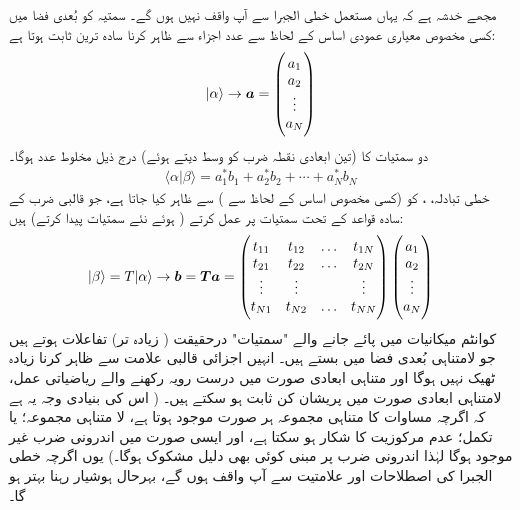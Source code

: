  مجھے خدشہ ہے کہ یہاں مستعمل خطی الجبرا سے آپ واقف نہیں ہوں گے۔ سمتیہ کو  بُعدی فضا میں کسی مخصوص معیاری عمودی اساس کے لحاظ سے  عدد اجزاء 
 سے ظاہر کرنا سادہ ترین ثابت ہوتا ہے:
	\begin{align}
		|\alpha \rangle \rightarrow {\ensuremath{{\boldsymbol{a}}}} = \begin{pmatrix} 
			a_{1}\\
			a_{2}\\
			\vdots\\
			a_{N}
		 \end{pmatrix}
	\end{align}
 دو سمتیات کا 
  (تین ابعادی نقطہ ضرب کو وسط دیتے ہوئے) درج ذیل مخلوط عدد ہوگا۔
\begin{align}\label{مساوات_قواعد_اندرونی_ضرب}
	\langle \alpha | \beta\rangle =a_1^{\ast}b_1 + a_2^{\ast}b_2 + \dotsb +a_N^{\ast}b_N
\end{align}
خطی تبادلہ، ، کو (کسی مخصوص اساس کے لحاظ سے )  سے ظاہر کیا جاتا ہے، جو قالبی ضرب کے سادہ قواعد کے تحت سمتیات پر عمل کرتے ( ہوئے نئے سمتیات پیدا کرتے) ہیں:
\begin{align}
	|\beta\rangle = T|\alpha \rangle \rightarrow {\ensuremath{{\boldsymbol{b}}}} = {{\boldsymbol{T}}}{{\boldsymbol{a}}} = \begin{pmatrix}
		t_{11} & t_{12} & \hdots & t_{1N} \\ 
		t_{21} & t_{22} & \hdots & t_{2N} \\
		\vdots & \vdots & & \vdots \\
		t_{N1} & t_{N2} & \hdots & t_{NN} 
	\end{pmatrix}
\begin{pmatrix}
	a_{1}\\
	a_{2}\\
	\vdots\\
	a_{N}
\end{pmatrix}
\end{align}
کوانٹم میکانیات میں پائے جانے والے "سمتیات" درحقیقت ( زیادہ تر) تفاعلات ہوتے ہیں جو لامتناہی بُعدی فضا میں بستے ہیں۔ انہیں  اجزائی قالبی علامت سے ظاہر کرنا زیادہ ٹھیک نہیں ہوگا اور متناہی ابعادی صورت میں درست رویہ رکھنے والے ریاضیاتی عمل، لامتناہی ابعادی صورت میں پریشان کن ثابت ہو سکتے ہیں۔ ( اس کی بنیادی وجہ یہ ہے کہ اگرچہ مساوات  کا متناہی مجموعہ ہر صورت موجود ہوتا ہے، لا متناہی مجموعہ؛ یا تکمل؛ عدم مرکوزیت کا شکار ہو سکتا ہے، اور ایسی صورت میں اندرونی ضرب غیر موجود ہوگا لہٰذا اندرونی ضرب پر مبنی کوئی بھی دلیل مشکوک ہوگا۔) یوں اگرچہ خطی الجبرا کی اصطلاحات اور علامتیت سے آپ واقف ہوں گے، بہرحال ہوشیار رہنا بہتر ہو گا۔

